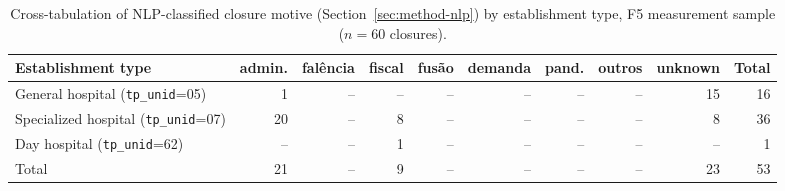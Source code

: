 \begin{table}[h!]
\centering
\caption{Cross-tabulation of NLP-classified closure motive (Section~\ref{sec:method-nlp}) by establishment type, F5 measurement sample ($n = 60$ closures).}
\label{tab:crosstab-motive}
\small
\begin{tabular}{lrrrrrrrrr}
\toprule
Establishment type & admin. & fal\^encia & fiscal & fus\~ao & demanda & pand. & outros & unknown & Total \\
\midrule
General hospital (\texttt{tp\_unid}=05) & 1 & -- & -- & -- & -- & -- & -- & 15 & 16 \\
Specialized hospital (\texttt{tp\_unid}=07) & 20 & -- & 8 & -- & -- & -- & -- & 8 & 36 \\
Day hospital (\texttt{tp\_unid}=62) & -- & -- & 1 & -- & -- & -- & -- & -- & 1 \\
\midrule
Total & 21 & -- & 9 & -- & -- & -- & -- & 23 & 53 \\
\bottomrule
\end{tabular}
\end{table}
